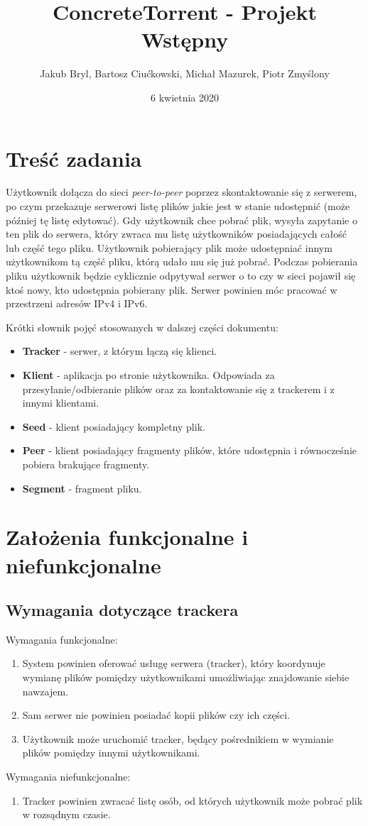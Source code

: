 \documentclass[11pt]{article}
\title{ConcreteTorrent - Projekt Wstępny}
\author{Jakub Bryl, Bartosz Ciućkowski, Michał Mazurek, Piotr Zmyślony}
\date{6 kwietnia 2020} %
\begin{document}
	\maketitle
	\setcounter{secnumdepth}{3}
	\setcounter{tocdepth}{3}
	\tableofcontents
	\clearpage
\section{Treść zadania}
Użytkownik dołącza do sieci \textsl{peer-to-peer} poprzez skontaktowanie się z serwerem, po czym przekazuje serwerowi listę plików jakie jest w stanie udostępnić (może później tę listę edytować). Gdy użytkownik chce pobrać plik, wysyła zapytanie o ten plik do serwera, który zwraca mu listę użytkowników posiadających całość lub część tego pliku. Użytkownik pobierający plik może udostępniać innym użytkownikom tą część pliku, którą udało mu się już pobrać. Podczas pobierania pliku użytkownik będzie cyklicznie odpytywał serwer o to czy w sieci pojawił się ktoś nowy, kto udostępnia pobierany plik. Serwer powinien móc pracować w przestrzeni adresów IPv4 i IPv6.

Krótki słownik pojęć stosowanych w dalszej części dokumentu:
\begin{itemize}
\item \textbf{Tracker} - serwer, z którym łączą się klienci.
\item \textbf{Klient} - aplikacja po stronie użytkownika. Odpowiada za przesyłanie/odbieranie plików oraz za kontaktowanie się z trackerem i z innymi klientami.
\item \textbf{Seed} - klient posiadający kompletny plik.
\item \textbf{Peer} - klient posiadający fragmenty plików, które udostępnia i równocześnie pobiera brakujące fragmenty.
\item \textbf{Segment} - fragment pliku.
\end{itemize}

\section{Założenia funkcjonalne i niefunkcjonalne}
\subsection{Wymagania dotyczące trackera}
Wymagania funkcjonalne:
\begin{enumerate}
\item System powinien oferować usługę serwera (tracker), który koordynuje wymianę plików pomiędzy użytkownikami umożliwiając znajdowanie siebie nawzajem.
\item Sam serwer nie powinien posiadać kopii plików czy ich części.
\item Użytkownik może uruchomić tracker, będący pośrednikiem w wymianie plików pomiędzy innymi użytkownikami.
\end{enumerate}
Wymagania niefunkcjonalne:
\begin{enumerate}
\item Tracker powinien zwracać listę osób, od których użytkownik może pobrać plik w rozsądnym czasie.
\end{enumerate}
\end{document}

